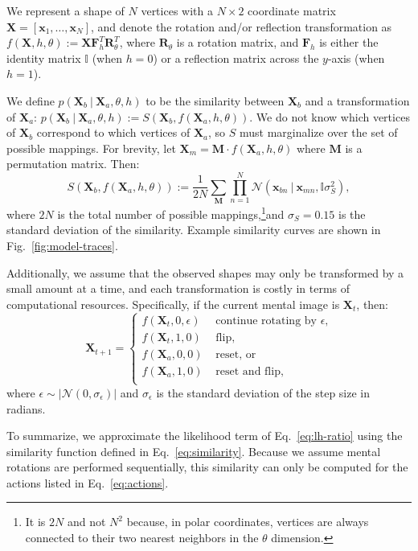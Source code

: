 \documentclass[10pt,letterpaper]{article}
\newcommand{\Xa}[0]{\mathbf{X}_a}
\newcommand{\Xb}[0]{\mathbf{X}_b}
\newcommand{\Xt}[0]{\mathbf{X}_t}
\newcommand{\R}[0]{\mathbf{R}_\theta}
\newcommand{\F}[0]{\mathbf{F}}
\newcommand{\M}[0]{\mathbf{M}}
\newcommand{\I}[0]{\mathbb{I}}
\newcommand{\hi}[0]{h=0}
\newcommand{\hf}[0]{h=1}
\begin{document}
We represent a shape of $N$ vertices with a $N\times 2$ coordinate
matrix $\mathbf{X}=[\mathbf{x}_1, \ldots{}, \mathbf{x}_N]$, and denote
the rotation and/or reflection transformation as $f(\mathbf{X}, h,
\theta):=\mathbf{X}\F_h^T\R^T$, where $\R$ is a rotation matrix, and
$\F_h$ is either the identity matrix $\I$ (when $\hi$) or a reflection
matrix across the $y$-axis (when $\hf$).

We define $p(\Xb\ \vert\ \Xa, \theta, h)$ to be the similarity between
$\Xb$ and a transformation of $\Xa$: $p(\Xb\ \vert\ \Xa, \theta, h):=
S(\Xb, f(\Xa, h, \theta))$.  We do not know which vertices of $\Xb$
correspond to which vertices of $\Xa$, so $S$ must marginalize over
the set of possible mappings. For brevity, let
$\mathbf{X}_m=\M\cdot{}f(\Xa, h, \theta)$ where $\M$ is a permutation
matrix. Then:
\begin{equation}
  S(\Xb, f(\Xa, h, \theta)):=\frac{1}{2N} \sum_{\M} \prod_{n=1}^N \mathcal{N}(\mathbf{x}_{bn}\ \vert \ \mathbf{x}_{mn}, \I\sigma_S^2),
  \label{eq:similarity}
\end{equation}
where $2N$ is the total number of possible mappings,\footnote{It is
  $2N$ and not $N^2$ because, in polar coordinates, vertices are
  always connected to their two nearest neighbors in the $\theta$
  dimension.}and $\sigma_S=0.15$ is the standard deviation of the
similarity. Example similarity curves are shown in
Fig.~\ref{fig:model-traces}.

Additionally, we assume that the observed shapes may only be
transformed by a small amount at a time, and each transformation is
costly in terms of computational resources. Specifically, if the
current mental image is $\Xt$, then:
\begin{equation}
  \mathbf{X}_{t+1} = \left\{ \begin{array}{ll}
      f(\Xt, 0, \epsilon) &\mbox{ continue rotating by $\epsilon$,} \\
      f(\Xt, 1, 0) &\mbox{ flip,} \\
      f(\Xa, 0, 0) &\mbox{ reset, or} \\
      f(\Xa, 1, 0) &\mbox{ reset and flip,} \\
    \end{array} \right.
  \label{eq:actions}
\end{equation}
where $\epsilon\sim \left|\mathcal{N}(0, \sigma_\epsilon)\right|$ and
$\sigma_\epsilon$ is the standard deviation of the step size in
radians.

To summarize, we approximate the likelihood term of
Eq.~\ref{eq:lh-ratio} using the similarity function defined in
Eq.~\ref{eq:similarity}. Because we assume mental rotations are
performed sequentially, this similarity can only be computed for the
actions listed in Eq.~\ref{eq:actions}.
\end{document}
